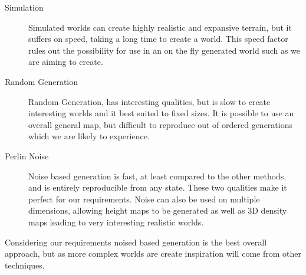\begin{description}
\item[Simulation]
Simulated worlds can create highly realistic
and expansive terrain, but it suffers on speed, taking a long time to create a 
world. This speed factor rules out the possibility for use in an on the fly 
generated world such as we are aiming to create. 

\item[Random Generation] Random Generation, has 
interesting qualities, but is slow to create interesting worlds and it best
suited to fixed sizes. It is possible to use an overall general map, but 
difficult to reproduce out of ordered generations which we are likely to
experience. 

\item[Perlin Noise] Noise based generation is fast, at least compared to the other
methods, and is entirely reproducible from any state. These two qualities make it
perfect for our requirements. Noise can also be used on multiple dimensions, 
allowing height maps to be generated as well as 3D density maps leading to very
interesting realistic worlds.
\end{description}

Considering our requirements noised based generation is the best overall 
approach,
but as more complex worlds are create inspiration will come from other 
techniques.\\
